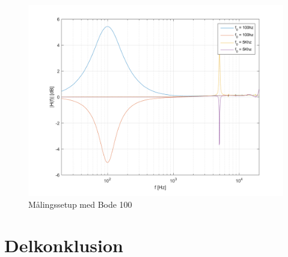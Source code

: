 \begin{figure}[h!]
	\centering
	\includegraphics[scale = 0.8]{billeder/Frekvensplacering_Med_hotfix}
	\caption{Målingssetup med Bode 100}
	\label{fig:Frekvensplacering_med_hotfix}
\end{figure}

\section{Delkonklusion}




